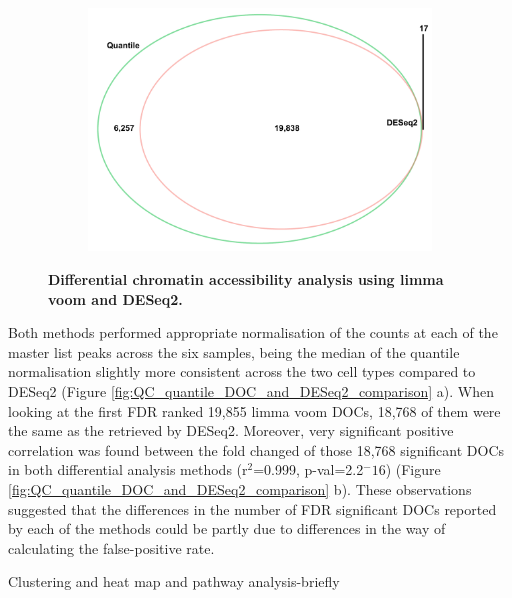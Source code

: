 \begin{figure}[htbp]
\begin{subfigure}{0.5\textwidth}
\includegraphics[width=\textwidth]{./Results1/pdfs/ATAC_Core_fresh_CD4vsCD14_venn_diagram_differential_analysis_FDR_01_quantile_DESeq2_only}
\caption{\textbf{}} %
\end{subfigure}%
\caption[Differential chromatin accessibility analysis for different background reads cut-offs.]{\textbf{Differential chromatin accessibility analysis using limma voom and DESeq2.\\
}}
\label{fig:DOC_quantile_DESeq2}
\end{figure} 


Both methods performed appropriate normalisation of the counts at each of the master list peaks across the six samples, being the median of the quantile normalisation slightly more consistent across the two cell types compared to DESeq2 (Figure \ref{fig:QC_quantile_DOC_and_DESeq2_comparison} a). When looking at the first FDR ranked 19,855 limma voom DOCs, 18,768 of them were the same as the retrieved by DESeq2. Moreover, very significant positive correlation was found between the fold changed of those 18,768 significant DOCs in both differential analysis methods (r$^2$=0.999, p-val=2.2$^-16$) (Figure \ref{fig:QC_quantile_DOC_and_DESeq2_comparison} b). These observations suggested that the differences in the number of FDR significant DOCs reported by each of the methods could be partly due to differences in the way of calculating the false-positive rate.

 
Clustering and heat map and pathway analysis-briefly


